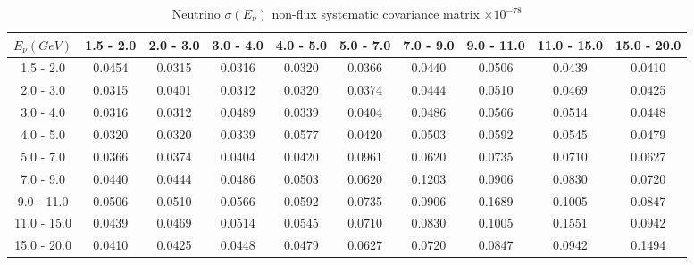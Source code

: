 \documentclass[aps,prl,twocolumn,showpacs,superscriptaddress,nofootinbib]{revtex4}
\begin{document}
\begingroup
\squeezetable
\begin{table}[h]
\tabcolsep=0.11cm
\begin{tabular}{c|ccccccccc}
$E_{\nu}(GeV)$ & 1.5 - 2.0 & 2.0 - 3.0 & 3.0 - 4.0 & 4.0 - 5.0 & 5.0 - 7.0 & 7.0 - 9.0 & 9.0 - 11.0 & 11.0 - 15.0 & 15.0 - 20.0\\
\hline
1.5 - 2.0& 0.0454	&0.0315	&0.0316	&0.0320	&0.0366	&0.0440	&0.0506	&0.0439	&0.0410	\\
2.0 - 3.0 &0.0315	&0.0401	&0.0312	&0.0320	&0.0374	&0.0444	&0.0510	&0.0469	&0.0425	\\
3.0 - 4.0 & 0.0316	&0.0312	&0.0489	&0.0339	&0.0404	&0.0486	&0.0566	&0.0514	&0.0448	\\
4.0 - 5.0 &0.0320	&0.0320	&0.0339	&0.0577	&0.0420	&0.0503	&0.0592	&0.0545	&0.0479	\\
5.0 - 7.0 &0.0366	&0.0374	&0.0404	&0.0420	&0.0961	&0.0620	&0.0735	&0.0710	&0.0627	\\
7.0 - 9.0 &0.0440	&0.0444	&0.0486	&0.0503	&0.0620	&0.1203	&0.0906	&0.0830	&0.0720	\\
9.0 - 11.0 &0.0506	&0.0510	&0.0566	&0.0592	&0.0735	&0.0906	&0.1689	&0.1005	&0.0847	\\
11.0 - 15.0 &0.0439	&0.0469	&0.0514	&0.0545	&0.0710	&0.0830	&0.1005	&0.1551	&0.0942	\\
15.0 - 20.0 &0.0410	&0.0425	&0.0448	&0.0479	&0.0627	&0.0720	&0.0847	&0.0942	&0.1494	\\
  
\end{tabular}
\caption{Neutrino $\sigma(E_\nu)$ non-flux systematic covariance matrix  $\times 10^{-78}$ }
\label{tab:enu-nonflux}
\end{table}
\endgroup
\end{document}
